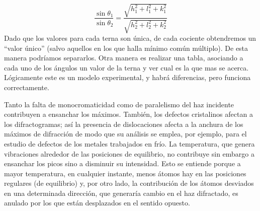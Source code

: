 \begin{equation}
    \frac{\sin \theta_1}{\sin \theta_2} = \frac{\sqrt{h_1^2+l_1^2+k_1^2}}{\sqrt{h_2^2+l_2^2+k_2^2}}
\end{equation}
Dado que los valores para cada terna son única, de cada cociente obtendremos un ``valor único'' (salvo aquellos en los que halla mínimo común múltiplo). De esta manera podríamos separarlos. Otra manera es realizar una tabla, asociando a cada uno de los ángulos un valor de la terna y ver cual es la que mas se acerca. Lógicamente este es un modelo experimental, y habrá diferencias, pero funciona correctamente. 

Tanto la falta de monocromaticidad como de paralelismo del haz incidente contribuyen a ensanchar los máximos. También, los defectos cristalinos afectan a los difractogramas; así la presencia de dislocaciones afecta a la anchura de los máximos de difracción de modo que su análisis se emplea, por ejemplo, para el estudio de defectos de los metales trabajados en frío. La temperatura, que genera vibraciones alrededor de las posiciones de equilibrio, no contribuye sin embargo a ensanchar los picos sino a disminuir su intensidad. Esto se entiende porque a mayor temperatura, en cualquier instante, menos átomos hay en las posiciones regulares (de equilibrio) y, por otro lado, la contribución de los átomos desviados en una determinada dirección, que generaría cambio en el haz difractado, es anulado por los que están desplazados en el sentido opuesto. 
    
